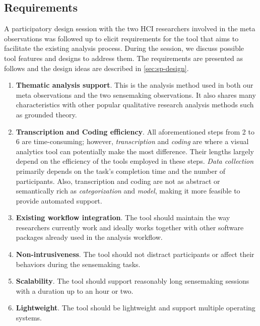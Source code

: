 \subsection{Requirements}
A participatory design session with the two HCI researchers involved in the meta observations was followed up to elicit requirements for the tool that aims to facilitate the existing analysis process. During the session, we discuss possible tool features and designs to address them. The requirements are presented as follows and the design ideas are described in \autoref{sec:sp-design}.

\begin{enumerate}
	\item \textbf{Thematic analysis support}. This is the analysis method used in both our meta observations and the two sensemaking observations. It also shares many characteristics with other popular qualitative research analysis methods such as grounded theory.

	\item \textbf{Transcription and Coding efficiency}. All aforementioned steps from 2 to 6 are time-consuming; however, \emph{transcription} and \emph{coding} are where a visual analytics tool can potentially make the most difference. Their lengths largely depend on the efficiency of the tools employed in these steps. \emph{Data collection} primarily depends on the task's completion time and the number of participants. Also, transcription and coding are not as abstract or semantically rich as \emph{categorization} and \emph{model}, making it more feasible to provide automated support.

%
%
	\item \textbf{Existing workflow integration}. The tool should maintain the way researchers currently work and ideally works together with other software packages already used in the analysis workflow.
	\item \textbf{Non-intrusiveness}. The tool should not distract participants or affect their behaviors during the sensemaking tasks.
	\item \textbf{Scalability}. The tool should support reasonably long sensemaking sessions with a duration up to an hour or two.
	\item \textbf{Lightweight}. The tool should be lightweight and support multiple operating systems.

\end{enumerate}
